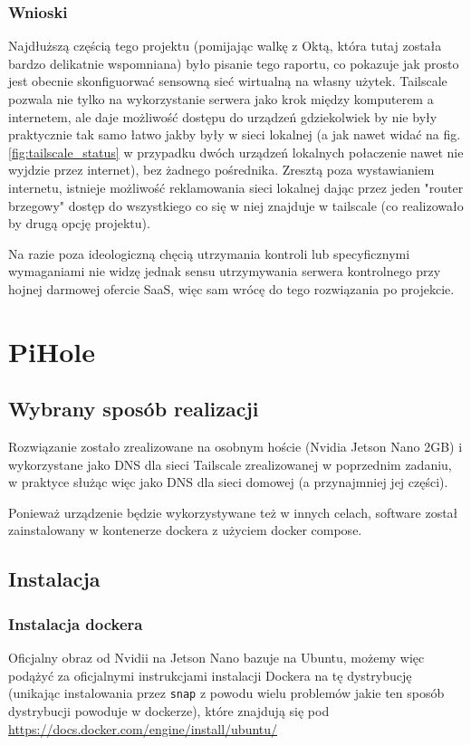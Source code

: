 \documentclass{report}
\numberwithin{equation}{section}
\begin{document}
\subsection{Wnioski}
Najdłuższą częścią tego projektu (pomijając walkę z Oktą, która tutaj została bardzo delikatnie wspomniana) było pisanie tego raportu, co pokazuje jak prosto jest obecnie skonfiguorwać sensowną sieć wirtualną na własny użytek. Tailscale pozwala nie tylko na wykorzystanie serwera jako krok między komputerem a internetem, ale daje możliwość dostępu do urządzeń gdziekolwiek by nie były praktycznie tak samo łatwo jakby były w sieci lokalnej (a jak nawet widać na fig. \ref{fig:tailscale_status} w przypadku dwóch urządzeń lokalnych połaczenie nawet nie wyjdzie przez internet), bez żadnego pośrednika. Zresztą poza wystawianiem internetu, istnieje możliwość reklamowania sieci lokalnej dając przez jeden "router brzegowy" dostęp do wszystkiego co się w niej znajduje w tailscale (co realizowało by drugą opcję projektu).

Na razie poza ideologiczną chęcią utrzymania kontroli lub specyficznymi wymaganiami nie widzę jednak sensu utrzymywania serwera kontrolnego przy hojnej darmowej ofercie SaaS, więc sam wrócę do tego rozwiązania po projekcie.
\chapter{PiHole}
\label{chap:pihole}
\section{Wybrany sposób realizacji}
Rozwiązanie zostało zrealizowane na osobnym hoście (Nvidia Jetson Nano 2GB) i wykorzystane jako DNS dla sieci Tailscale zrealizowanej w poprzednim zadaniu, w praktyce służąc więc jako DNS dla sieci domowej (a przynajmniej jej części).

Ponieważ urządzenie będzie wykorzystywane też w innych celach, software został zainstalowany w kontenerze dockera z użyciem docker compose.

\section{Instalacja}
\subsection{Instalacja dockera}
Oficjalny obraz od Nvidii na Jetson Nano bazuje na Ubuntu, możemy więc podążyć za oficjalnymi instrukcjami instalacji Dockera na tę dystrybucję (unikając instalowania przez \texttt{snap} z powodu wielu problemów jakie ten sposób dystrybucji powoduje w dockerze), które znajdują się pod \url{https://docs.docker.com/engine/install/ubuntu/}
\end{document}

